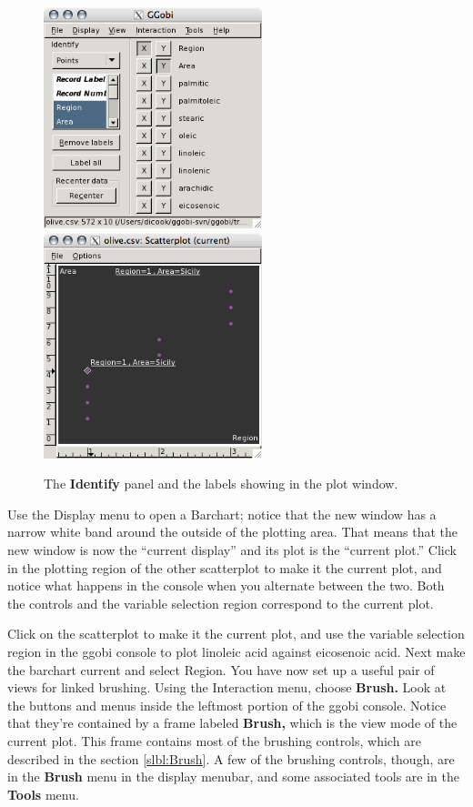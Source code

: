 \documentclass[11pt]{article}
\def\Widget#1{\textbf{#1}}
\begin{document}
\begin{figure}[htp]
\begin{center}
\includegraphics[width=2.5in]{Figures/olive-identifypanel.png}\hspace{0.2in}\includegraphics[width=2.5in]{Figures/olive-identify.png}
\end{center}
\caption{The \Widget{Identify} panel and the labels showing in the plot window.}
\label{fig:identify}
\end{figure}

Use the Display menu to open a Barchart; notice that the new window
has a narrow white band around the outside of the plotting area.  That
means that the new window is now the ``current display'' and its plot
is the ``current plot.''  Click in the plotting region of the other
scatterplot to make it the current plot, and notice what happens in
the console when you alternate between the two.  Both the controls and
the variable selection region correspond to the current plot.

Click on the scatterplot to make it the current plot, and use the
variable selection region in the ggobi console to plot linoleic acid
against eicosenoic acid.  Next make the barchart current and select
Region.  You have now set up a useful pair of views for linked
brushing.  Using the Interaction menu, choose \Widget{Brush.}  Look at
the buttons and menus inside the leftmost portion of the ggobi
console.  Notice that they're contained by a frame labeled
\Widget{Brush,} which is the view mode of the current plot.  This
frame contains most of the brushing controls, which are described in
the section \ref{slbl:Brush}.  A few of the brushing controls, though,
are in the \Widget{Brush} menu in the display menubar, and some
associated tools are in the \Widget{Tools} menu.
\end{document}
